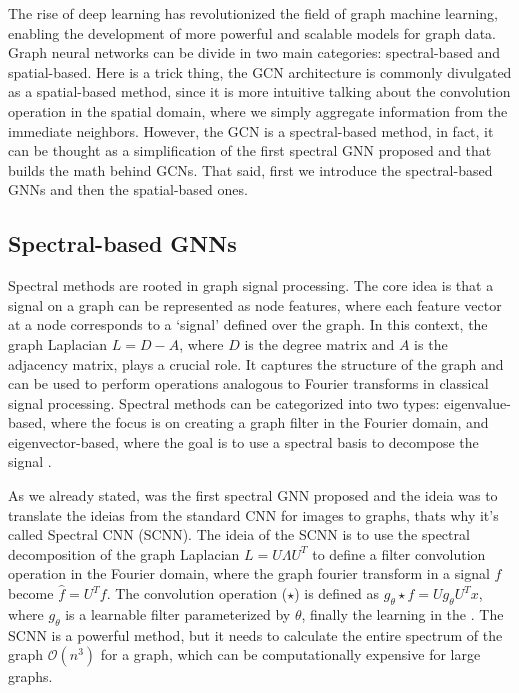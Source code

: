 The rise of deep learning has revolutionized the field of graph machine learning, enabling the development of more powerful and scalable models for graph data. Graph neural networks can be divide in two main categories: spectral-based and spatial-based. Here is a trick thing, the GCN architecture \cite{kipf2016semi} is commonly divulgated as a spatial-based method, since it is more intuitive talking about the convolution operation in the spatial domain, where we simply aggregate information from the immediate neighbors. However, the GCN is a spectral-based method, in fact, it can be thought as a simplification of the first spectral GNN \cite{bruna2013spectral} proposed and that builds the math behind GCNs. That said, first we introduce the spectral-based GNNs and then the spatial-based ones.

\subsection{Spectral-based GNNs}

Spectral methods are rooted in graph signal processing. The core idea is that a signal on a graph can be represented as node features, where each feature vector at a node corresponds to a `signal' defined over the graph. In this context, the graph Laplacian $L = D - A$, where $D$ is the degree matrix and $A$ is the adjacency matrix, plays a crucial role. It captures the structure of the graph and can be used to perform operations analogous to Fourier transforms in classical signal processing. Spectral methods can be categorized into two types: eigenvalue-based, where the focus is on creating a graph filter in the Fourier domain, and eigenvector-based, where the goal is to use a spectral basis to decompose the signal \cite{bo2023surveyspectralgraphneural}.

As we already stated,  was the first spectral GNN proposed and the ideia was to translate the ideias from the standard CNN for images to graphs, thats why it's called Spectral CNN (SCNN). The ideia of the SCNN is to use the spectral decomposition of the graph Laplacian $L= U \Lambda U^T $ to define a filter convolution operation in the Fourier domain, where the graph fourier transform in a signal $f$ become $\hat{f}= U^T f$. The convolution operation ($\star$) is defined as $g_{\theta} \star f = U g_{\theta} U^T x$, where $g_{\theta}$ is a learnable filter parameterized by $\theta$, finally the learning in the . The SCNN is a powerful method, but it needs to calculate the entire spectrum of the graph $\mathcal{O}(n^3)$ for a graph, which can be computationally expensive for large graphs.

